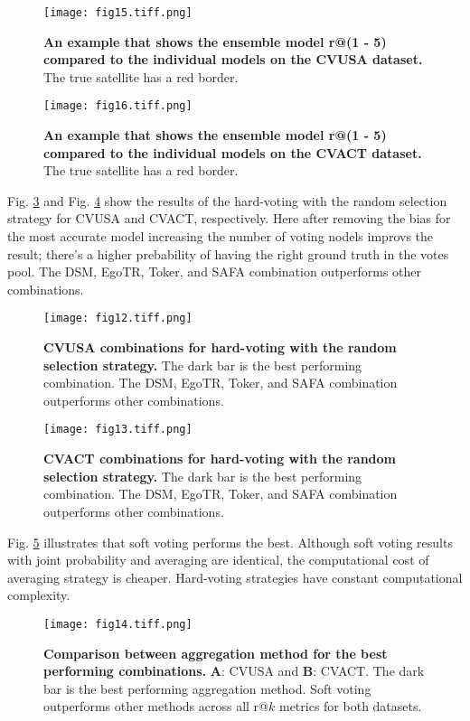\documentclass[10pt,letterpaper]{article}
\newif\ifhighlight
\newcommand{\hlb}[1]{\ifhighlight{\hl{#1}}\else{#1}\fi}
\begin{document}
\begin{figure}[!ht]
  \caption{{\bf An example that shows the ensemble model r@(1 - 5) compared to the individual models on the CVUSA dataset.} The true satellite has a red border.}
  \texttt{[image: fig15.tiff.png]}
  \label{fig15}
\end{figure}

\begin{figure}[!ht]
  \caption{{\bf An example that shows the ensemble model r@(1 - 5) compared to the individual models on the CVACT dataset.}  The true satellite has a red border.}
  \texttt{[image: fig16.tiff.png]}
  \label{fig16}
\end{figure}

\hlb{Fig.} \ref{fig12} and \hlb{Fig.} \ref{fig13} show the results of the hard-voting with the random selection strategy for CVUSA and CVACT, respectively. \hlb{Here after removing the bias for the most accurate model increasing the number of voting nodels improvs the result; there's a higher prebability of having the right ground truth in the votes pool.} The DSM, EgoTR, Toker, and SAFA combination outperforms other combinations.

\begin{figure}[!ht]
  \caption{{\bf CVUSA combinations for hard-voting with the random selection strategy.} The dark bar is the best performing combination. The DSM, EgoTR, Toker, and SAFA combination outperforms other combinations. }
  \texttt{[image: fig12.tiff.png]}
  \label{fig12}
\end{figure}

\begin{figure}[!ht]
  \caption{{\bf CVACT combinations for hard-voting with the random selection strategy.} The dark bar is the best performing combination. The DSM, EgoTR, Toker, and SAFA combination outperforms other combinations.}
  \texttt{[image: fig13.tiff.png]}
  \label{fig13}
\end{figure}

\FloatBarrier

\hlb{Fig.} \ref{fig14} illustrates that soft voting performs the best. Although soft voting results with joint probability and averaging are identical, the computational cost of averaging strategy is cheaper. Hard-voting strategies have constant computational complexity. 

\begin{figure}[!ht]
  \caption{{\bf Comparison between aggregation method for the best performing combinations. } {\bf A}: CVUSA and {\bf B}: CVACT.  The dark bar is the best performing aggregation method. Soft voting outperforms other methods across all r@\hlb{$k$} metrics for both datasets.}
  \texttt{[image: fig14.tiff.png]}
  \label{fig14}
\end{figure}
\end{document}
